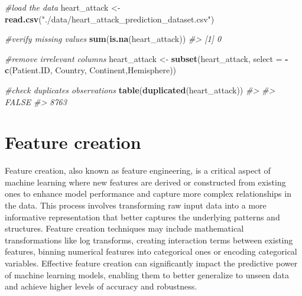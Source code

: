 \documentclass[
]{book}
\newenvironment{Shaded}{\begin{snugshade}}{\end{snugshade}}
\newcommand{\AttributeTok}[1]{\textcolor[rgb]{0.13,0.29,0.53}{#1}}
\newcommand{\CommentTok}[1]{\textcolor[rgb]{0.56,0.35,0.01}{\textit{#1}}}
\newcommand{\FunctionTok}[1]{\textcolor[rgb]{0.13,0.29,0.53}{\textbf{#1}}}
\newcommand{\NormalTok}[1]{#1}
\newcommand{\OtherTok}[1]{\textcolor[rgb]{0.56,0.35,0.01}{#1}}
\newcommand{\SpecialCharTok}[1]{\textcolor[rgb]{0.81,0.36,0.00}{\textbf{#1}}}
\newcommand{\StringTok}[1]{\textcolor[rgb]{0.31,0.60,0.02}{#1}}
\begin{document}
\begin{Shaded}
\begin{Highlighting}[]
\CommentTok{\#load the data}
\NormalTok{heart\_attack }\OtherTok{\textless{}{-}} \FunctionTok{read.csv}\NormalTok{(}\StringTok{"./data/heart\_attack\_prediction\_dataset.csv"}\NormalTok{)}

\CommentTok{\#verify missing values}
\FunctionTok{sum}\NormalTok{(}\FunctionTok{is.na}\NormalTok{(heart\_attack))}
\CommentTok{\#\textgreater{} [1] 0}

\CommentTok{\#remove irrelevant columns}
\NormalTok{heart\_attack }\OtherTok{\textless{}{-}} \FunctionTok{subset}\NormalTok{(heart\_attack, }\AttributeTok{select =} \SpecialCharTok{{-}}\FunctionTok{c}\NormalTok{(Patient.ID, Country, Continent,Hemisphere))}

\CommentTok{\#check duplicates observations}
\FunctionTok{table}\NormalTok{(}\FunctionTok{duplicated}\NormalTok{(heart\_attack))}
\CommentTok{\#\textgreater{} }
\CommentTok{\#\textgreater{} FALSE }
\CommentTok{\#\textgreater{}  8763}
\end{Highlighting}
\end{Shaded}

\hypertarget{feature-creation}{%
\section{\texorpdfstring{Feature creation\\
}{Feature creation }}\label{feature-creation}}

Feature creation, also known as feature engineering, is a critical aspect of machine learning where new features are derived or constructed from existing ones to enhance model performance and capture more complex relationships in the data. This process involves transforming raw input data into a more informative representation that better captures the underlying patterns and structures. Feature creation techniques may include mathematical transformations like log transforms, creating interaction terms between existing features, binning numerical features into categorical ones or encoding categorical variables. Effective feature creation can significantly impact the predictive power of machine learning models, enabling them to better generalize to unseen data and achieve higher levels of accuracy and robustness.
\end{document}
